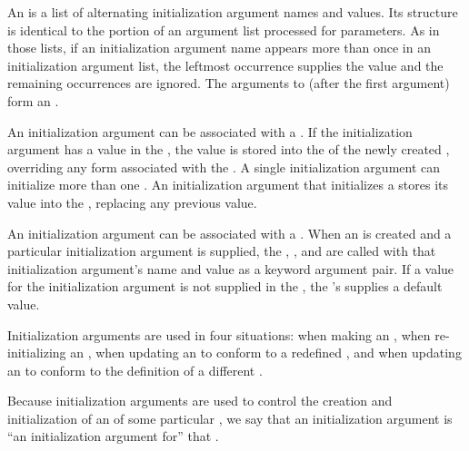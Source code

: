 An  is a list of alternating
initialization argument names and values.  Its structure is identical
to the portion of an argument list
processed for  parameters.  As in those lists, if an initialization
argument name appears more than once in an initialization argument list,
the leftmost occurrence supplies the value and the remaining occurrences
are ignored.  The arguments to  (after the first
argument) form an .

An initialization argument can be associated with a .  If
the initialization argument has a value in the , the value is stored into the  of the newly
created , overriding any  form associated
with the .  A single initialization argument can initialize
more than one .  An initialization argument that initializes
a  stores its value into the ,
replacing any previous value.

An initialization argument can be associated with a .  When
an  is created and a particular initialization argument is
supplied, the  ,
, and  are called
with that initialization argument's name and value as a keyword argument
pair.  If a value for the initialization argument is not supplied in the
, the 's 
 supplies a default value.

Initialization arguments are used in four situations: when making an
, when re-initializing an , when updating
an  to conform to a redefined , and when
updating an  to conform to the definition of a different
.

Because initialization arguments are used to control the creation and
initialization of an  of some particular ,
we say that an initialization argument is
``an initialization argument for'' that .

